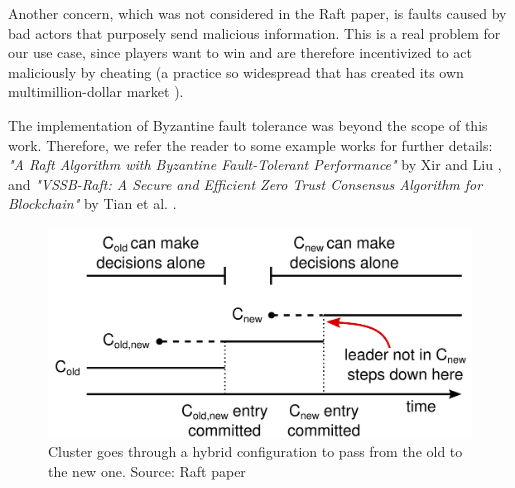Another concern, which was not considered in the Raft paper, is faults caused by bad actors that purposely send malicious information. This is a real problem for our use case, since players want to win and are therefore incentivized to act maliciously by cheating (a practice so widespread that has created its own multimillion-dollar market \cite{wiredCheat}).

The implementation of Byzantine fault tolerance was beyond the scope of this work. Therefore, we refer the reader to some example works for further details: \textit{"A Raft Algorithm with Byzantine Fault-Tolerant Performance"} by Xir and Liu \cite{liuXie}, and \textit{"VSSB-Raft: A Secure and Efficient Zero Trust Consensus Algorithm for Blockchain"} by Tian et al. \cite{tianetal}.

\begin{figure}[h]
  \centering
  \includegraphics[width=.6\linewidth]{images/raftMembershipChange.png}
  \caption{Cluster goes through a hybrid configuration to pass from the old to the new one. Source: Raft paper \cite{raft}}
  \label{fig:configRaft}
\end{figure}
